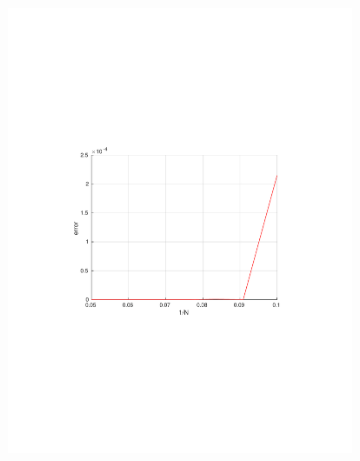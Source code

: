 \begin{figure}[h!]
  \centering
  \begin{subfigure}[b]{0.48\textwidth}
		\includegraphics[width=\textwidth]{Figures/Spec_difftrans_Convergence.pdf}
  \end{subfigure}%
  \quad
  \begin{subfigure}[b]{0.48\textwidth}

\end{subfigure}
\end{figure}

